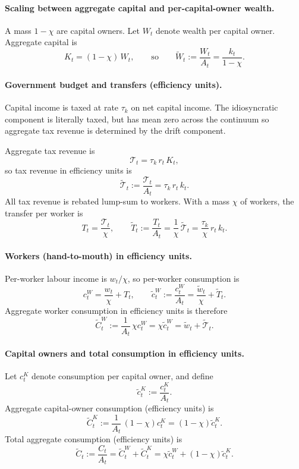 \documentclass{article}
\begin{document}
\paragraph{Scaling between aggregate capital and per-capital-owner wealth.}
A mass $1-\chi$ are capital owners. Let $W_t$ denote wealth per capital owner. Aggregate capital is
$$
K_t = (1-\chi)\,W_t,
\qquad\text{so}\qquad
\tilde W_t := \frac{W_t}{A_t} = \frac{k_t}{1-\chi}.
$$

\paragraph{Government budget and transfers (efficiency units).}
Capital income is taxed at rate $\tau_k$ on net capital income. The idiosyncratic component is literally taxed, but has mean zero across the continuum so aggregate tax revenue is determined by the drift component.

Aggregate tax revenue is
$$
\mathcal{T}_t = \tau_k\,r_t\,K_t,
$$
so tax revenue in efficiency units is
$$
\tilde{\mathcal{T}}_t := \frac{\mathcal{T}_t}{A_t} = \tau_k\,r_t\,k_t.
$$
All tax revenue is rebated lump-sum to workers. With a mass $\chi$ of workers, the transfer per worker is
$$
T_t = \frac{\mathcal{T}_t}{\chi},
\qquad
\tilde T_t := \frac{T_t}{A_t} = \frac{1}{\chi}\,\tilde{\mathcal{T}}_t
= \frac{\tau_k}{\chi}\,r_t\,k_t.
$$

\paragraph{Workers (hand-to-mouth) in efficiency units.}
Per-worker labour income is $w_t/\chi$, so per-worker consumption is
$$
c^W_t = \frac{w_t}{\chi} + T_t,
\qquad
\tilde c^W_t := \frac{c^W_t}{A_t}
= \frac{\tilde w_t}{\chi} + \tilde T_t.
$$
Aggregate worker consumption in efficiency units is therefore
$$
\tilde C^W_t := \frac{1}{A_t}\,\chi c^W_t
= \chi \tilde c^W_t
= \tilde w_t + \tilde{\mathcal{T}}_t.
$$

\paragraph{Capital owners and total consumption in efficiency units.}
Let $c^K_t$ denote consumption per capital owner, and define
$$
\tilde c^K_t := \frac{c^K_t}{A_t}.
$$
Aggregate capital-owner consumption (efficiency units) is
$$
\tilde C^K_t := \frac{1}{A_t}\,(1-\chi)c^K_t = (1-\chi)\tilde c^K_t.
$$
Total aggregate consumption (efficiency units) is
$$
\tilde C_t := \frac{C_t}{A_t} = \tilde C^W_t + \tilde C^K_t
= \chi \tilde c^W_t + (1-\chi)\tilde c^K_t.
$$
\end{document}
